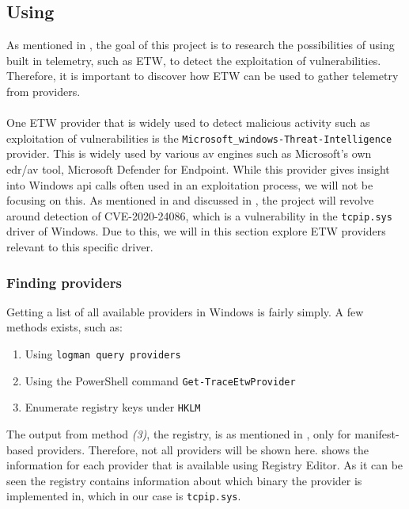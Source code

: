 \documentclass{report}
\begin{document}
\subsection{Using }
\label{cha:etw:constructing-trace-session}
As mentioned in , the goal of this project is to research the possibilities of using built in telemetry, such as \gls{ETW}, to detect the exploitation of vulnerabilities. Therefore, it is important to discover how \gls{ETW} can be used to gather telemetry from providers.
\\
\\
One \gls{ETW} provider that is widely used to detect malicious activity such as exploitation of vulnerabilities is the \texttt{Microsoft_windows-Threat-Intelligence}\cite{url:etw:etwti} provider. This is widely used by various \gls{av} engines such as Microsoft's own \gls{edr}/\gls{av} tool, Microsoft Defender for Endpoint. While this provider gives insight into Windows \gls{api} calls often used in an exploitation process, we will not be focusing on this. As mentioned in  and discussed in , the project will revolve around detection of CVE-2020-24086, which is a vulnerability in the \texttt{tcpip.sys} driver of Windows. Due to this, we will in this section explore \gls{ETW} providers relevant to this specific driver.

\subsubsection{Finding providers}
Getting a list of all available providers in Windows is fairly simply. A few methods exists, such as:

\begin{enumerate}
    \item Using \texttt{logman query providers}
    \item Using the PowerShell command \texttt{Get-TraceEtwProvider}
    \item Enumerate registry keys under \texttt{HKLM\SOFTWARE\Microsoft\Windows\CurrentVersion\WINEVT\Publishers}
\end{enumerate}

The output from method \emph{(3)}, the registry, is as mentioned in , only for manifest-based providers. Therefore, not all providers will be shown here.  shows the information for each provider that is available using Registry Editor. As it can be seen the registry contains information about which binary the provider is implemented in, which in our case is \texttt{tcpip.sys}. 
\end{document}
